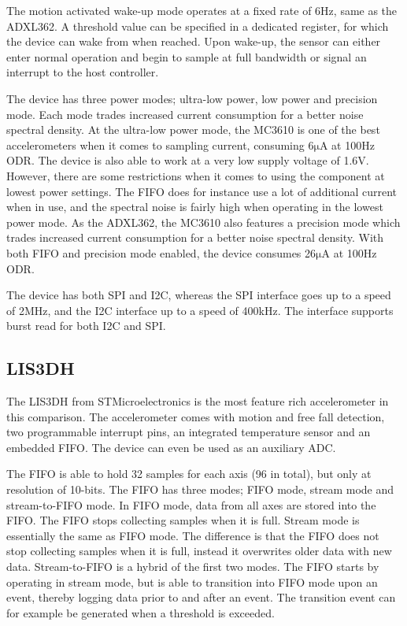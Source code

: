 The motion activated wake-up mode operates at a fixed rate of 6Hz, same as the ADXL362. A threshold value can be specified in a dedicated register, for which the device can wake from when reached. Upon wake-up, the sensor can either enter normal operation and begin to sample at full bandwidth or signal an interrupt to the host controller.

The device has three power modes; ultra-low power, low power and precision mode. Each mode trades increased current consumption for a better noise spectral density. At the ultra-low power mode, the MC3610 is one of the best accelerometers when it comes to sampling current, consuming 6$\si{\micro\ampere}$ at 100Hz ODR. The device is also able to work at a very low supply voltage of 1.6V. However, there are some restrictions when it comes to using the component at lowest power settings. The FIFO does for instance use a lot of additional current when in use, and the spectral noise is fairly high when operating in the lowest power mode. As the ADXL362, the MC3610 also features a precision mode which trades increased current consumption for a better noise spectral density. With both FIFO and precision mode enabled, the device consumes 26$\si{\micro\ampere}$ at 100Hz ODR. 

The device has both SPI and I2C, whereas the SPI interface goes up to a speed of 2MHz, and the I2C interface up to a speed of 400kHz. The interface supports burst read for both I2C and SPI.

\subsection{LIS3DH}

The LIS3DH from STMicroelectronics is the most feature rich accelerometer in this comparison. The accelerometer comes with motion and free fall detection, two programmable interrupt pins, an integrated temperature sensor and an embedded FIFO. The device can even be used as an auxiliary ADC.

The FIFO is able to hold 32 samples for each axis (96 in total), but only at resolution of 10-bits. The FIFO has three modes; FIFO mode, stream mode and stream-to-FIFO mode. In FIFO mode, data from all axes are stored into the FIFO. The FIFO stops collecting samples when it is full. Stream mode is essentially the same as FIFO mode. The difference is that the FIFO does not stop collecting samples when it is full, instead it overwrites older data with new data. Stream-to-FIFO is a hybrid of the first two modes. The FIFO starts by operating in stream mode, but is able to transition into FIFO mode upon an event, thereby logging data prior to and after an event. The transition event can for example be generated when a threshold is exceeded.

